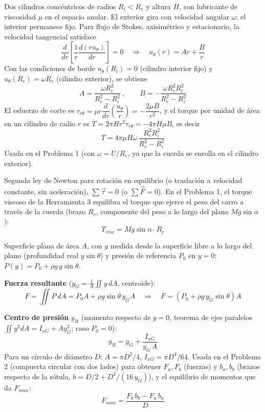 \documentclass[12pt]{article}
\begin{document}

Dos cilindros conc\'entricos de radios $R_i<R_e$ y altura $H$, con lubricante de
viscosidad $\mu$ en el espacio anular. El exterior gira con velocidad angular $\omega$;
el interior permanece fijo. Para flujo de Stokes, axisim\'etrico y estacionario, la
velocidad tangencial satisface
\[
\frac{d}{dr}\left[\frac1r\frac{d(ru_\theta)}{dr}\right]=0
\quad\Longrightarrow\quad
u_\theta(r)=Ar+\frac{B}{r}
\]
Con las condiciones de borde $u_\theta(R_i)=0$ (cilindro interior fijo) y
$u_\theta(R_e)=\omega R_e$ (cilindro exterior), se obtiene
\[
A=\frac{\omega R_e^2}{R_e^2-R_i^2}\ ,\qquad B=-\frac{\omega R_e^2R_i^2}{R_e^2-R_i^2}
\]
El esfuerzo de corte es $\tau_{r\theta}=\mu r\dfrac{d}{dr}\!\left(\dfrac{u_\theta}{r}\right)=-\dfrac{2\mu B}{r^2}$,
y el torque por unidad de \'area en un cilindro de radio $r$ es
$T=2\pi H r^2\tau_{r\theta}=-4\pi H\mu B$, es decir
\[
\boxed{T=4\pi\mu H\omega\,\frac{R_e^2R_i^2}{R_e^2-R_i^2}}
\]
Usada en el Problema 1 (con $\omega=U/R_e$, ya que la cuerda se enrolla en el cilindro
exterior).


Segunda ley de Newton para rotaci\'on en equilibrio (o traslaci\'on a velocidad
constante, sin aceleraci\'on), $\sum \vec\tau=0$ (o $\sum\vec F=0$). En el Problema 1,
el torque viscoso de la Herramienta 3 equilibra el torque que ejerce el peso del carro
a trav\'es de la cuerda (brazo $R_e$, componente del peso a lo largo del plano
$Mg\sin\alpha$):
\[
\boxed{T_{visc}=Mg\sin\alpha\cdot R_e}
\]


Superficie plana de \'area $A$, con $y$ medida desde la superficie libre a lo largo del
plano (profundidad real $y\sin\theta$) y presi\'on de referencia $P_0$ en $y=0$:
$P(y)=P_0+\rho g\,y\sin\theta$.

\textbf{Fuerza resultante} ($y_G=\frac1A\iint y\,dA$, centroide):
\[
F=\iint P\,dA=P_0A+\rho g\sin\theta\,y_G A
\quad\Longrightarrow\quad
\boxed{F=\left(P_0+\rho g\,y_G\sin\theta\right)A}
\]

\textbf{Centro de presi\'on} $y_R$ (momento respecto de $y=0$, teorema de ejes
paralelos $\iint y^2dA=I_{xG}+Ay_G^2$; caso $P_0=0$):
\[
\boxed{y_R=y_G+\frac{I_{xG}}{y_G\,A}}
\]
Para un c\'irculo de di\'ametro $D$: $A=\pi D^2/4$, $I_{xG}=\pi D^4/64$. Usada en el
Problema 2 (compuerta circular con dos lados) para obtener $F_a,F_b$ (fuerzas) y
$b_a,b_b$ (brazos respecto de la r\'otula, $b=D/2+D^2/(16\,y_G)$), y el equilibrio de
momentos que da $F_{max}$:
\[
\boxed{F_{max}=\frac{F_b\,b_b-F_a\,b_a}{D}}
\]
\end{document}
